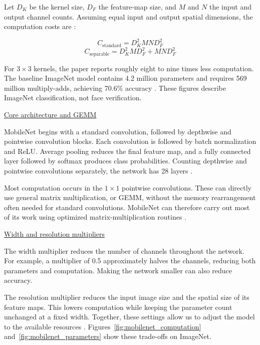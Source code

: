 \documentclass[11pt,a4paper,twocolumn]{article}
\begin{document}
Let $D_K$ be the kernel size, $D_F$ the feature-map size, and $M$ and $N$ the input and output channel counts. Assuming equal input and output spatial dimensions, the computation costs are \cite{howard2017mobilenets}:

\begin{equation}
C_{\text{standard}}=D_K^2MND_F^2
\end{equation}
\begin{equation}
C_{\text{separable}}=D_K^2MD_F^2+MND_F^2
\end{equation}

For $3\times3$ kernels, the paper reports roughly eight to nine times less computation. The baseline ImageNet model contains 4.2 million parameters and requires 569 million multiply-adds, achieving 70.6\% accuracy \cite{howard2017mobilenets}. These figures describe ImageNet classification, not face verification.

\noindent\underline{Core architecture and GEMM}\par\nopagebreak[4]

MobileNet begins with a standard convolution, followed by depthwise and pointwise convolution blocks. Each convolution is followed by batch normalization and ReLU. Average pooling reduces the final feature map, and a fully connected layer followed by softmax produces class probabilities. Counting depthwise and pointwise convolutions separately, the network has 28 layers \cite{howard2017mobilenets}.

Most computation occurs in the $1\times1$ pointwise convolutions. These can directly use general matrix multiplication, or GEMM, without the memory rearrangement often needed for standard convolutions. MobileNet can therefore carry out most of its work using optimized matrix-multiplication routines \cite{howard2017mobilenets}.

\noindent\underline{Width and resolution multipliers}\par\nopagebreak[4]

The width multiplier reduces the number of channels throughout the network. For example, a multiplier of 0.5 approximately halves the channels, reducing both parameters and computation. Making the network smaller can also reduce accuracy.

The resolution multiplier reduces the input image size and the spatial size of its feature maps. This lowers computation while keeping the parameter count unchanged at a fixed width. Together, these settings allow us to adjust the model to the available resources \cite{howard2017mobilenets}. Figures~\ref{fig:mobilenet_computation} and~\ref{fig:mobilenet_parameters} show these trade-offs on ImageNet.
\end{document}
